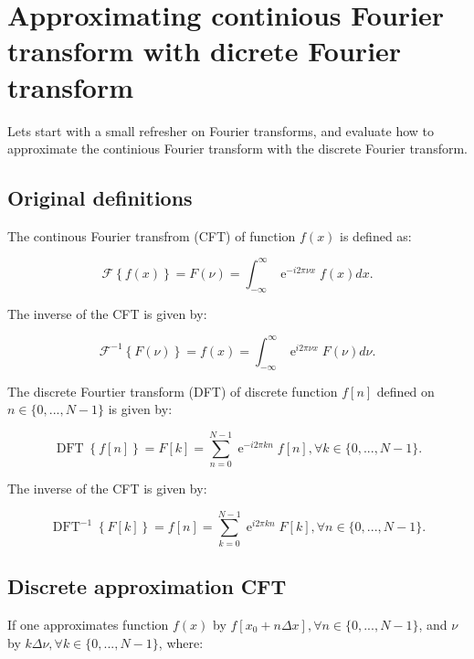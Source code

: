 \section{Approximating continious Fourier transform with dicrete Fourier transform} \label{sect_DFT}
Lets start with a small refresher on Fourier transforms, and evaluate how to approximate the continious Fourier transform with the discrete Fourier transform.

\subsection{Original definitions}
The continous Fourier transfrom (CFT) of function $f(x)$ is defined as:

\begin{equation}\label{eq_def_CFT}
\mathcal{F}\left\{f(x)\right\} = F(\nu) = \int^{\infty}_{-\infty} \operatorname{e}^{-i2\pi\nu x} f(x) dx.
\end{equation}


The inverse of the CFT is given by:

\begin{equation}\label{eq_def_iCFT}
\mathcal{F}^{-1}\left\{F(\nu)\right\} = f(x) = \int^{\infty}_{-\infty} \operatorname{e}^{i2\pi\nu x} F(\nu) d\nu.
\end{equation}

The discrete Fourtier transform (DFT) of discrete function $f[n]$ defined on $n \in \{0, ..., N-1\}$ is given by:

\begin{equation}\label{eq_def_DFT}
\operatorname{DFT}\left\{f[n]\right\} = F[k] = \sum^{N-1}_{n=0} \operatorname{e}^{-i2\pi kn} f[n], \forall k \in \{0, ..., N-1\}.
\end{equation}


The inverse of the CFT is given by:

\begin{equation}\label{eq_def_iDFT}
\operatorname{DFT}^{-1}\left\{F[k]\right\} = f[n] = \sum^{N-1}_{k=0} \operatorname{e}^{i2\pi kn} F[k], \forall n \in \{0, ..., N-1\}.
\end{equation}

\subsection{Discrete approximation CFT}


If one approximates function $f(x)$ by $f[x_0 + n\Delta x], \forall n \in \{0,...,N-1\}$, and $\nu$ by $k\Delta \nu, \forall k \in \{0, ..., N-1\}$, where:

